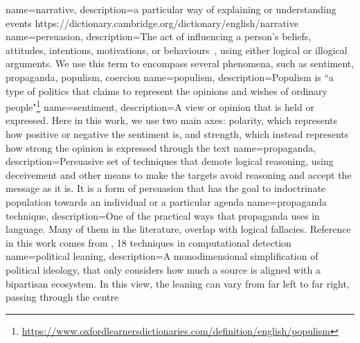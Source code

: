 {
    name=narrative,
    description={a particular way of explaining or understanding events
            https://dictionary.cambridge.org/dictionary/english/narrative
        }
}
{
    name=persuasion,
    description={The act of influencing a person's beliefs, attitudes, intentions, motivations, or behaviours~\cite{gass2018persuasion}, using either logical or illogical arguments. We use this term to encompass several phenomena, such as sentiment, \gls{propaganda}, \gls{populism}, coercion}
}
{
    name=populism,
    description={Populism is ``a type of politics that claims to represent the opinions and wishes of ordinary people"\footnote{\url{https://www.oxfordlearnersdictionaries.com/definition/english/populism}}}
}
{
    name=sentiment,
    description={A view or opinion that is held or expressed. Here in this work, we use two main axes: polarity, which represents how positive or negative the sentiment is, and strength, which instead represents how strong the opinion is expressed through the text}
}
{
    name=propaganda,
    description={Persuasive set of techniques that demote logical reasoning, using deceivement and other means to make the targets avoid reasoning and accept the message as it is. It is a form of persuasion that has the goal to indoctrinate population towards an individual or a particular agenda}
}
{
    name=propaganda technique,
    description={One of the practical ways that propaganda uses in language. Many of them in the literature, overlap with logical fallacies. Reference in this work comes from \cite{TODO}, 18 techniques in computational detection}
}
{
    name=political leaning,
    description={A monodimensional simplification of political ideology, that only considers how much a source is aligned with a bipartisan ecosystem. In this view, the leaning can vary from far left to far right, passing through the centre}
}
